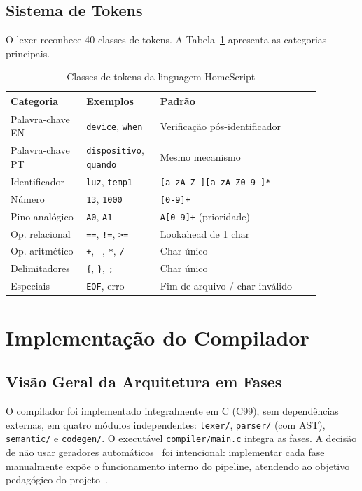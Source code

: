 \documentclass[conference]{IEEEtran}
\begin{document}
\subsection{Sistema de Tokens}

O lexer reconhece 40 classes de tokens. A Tabela~\ref{tab:tokens} apresenta
as categorias principais.

\begin{table}[htbp]
\caption{Classes de tokens da linguagem HomeScript}
\label{tab:tokens}
\centering
\begin{tabular}{p{0.21\linewidth}p{0.20\linewidth}p{0.47\linewidth}}
\toprule
\textbf{Categoria} & \textbf{Exemplos} & \textbf{Padrão} \\
\midrule
Palavra-chave EN & \texttt{device}, \texttt{when} & Verificação pós-identificador \\
Palavra-chave PT & \texttt{dispositivo}, \texttt{quando} & Mesmo mecanismo \\
Identificador & \texttt{luz}, \texttt{temp1} & \texttt{[a-zA-Z\_][a-zA-Z0-9\_]*} \\
Número & \texttt{13}, \texttt{1000} & \texttt{[0-9]+} \\
Pino analógico & \texttt{A0}, \texttt{A1} & \texttt{A[0-9]+} (prioridade) \\
Op. relacional & \texttt{==}, \texttt{!=}, \texttt{>=} & Lookahead de 1 char \\
Op. aritmético & \texttt{+}, \texttt{-}, \texttt{*}, \texttt{/} & Char único \\
Delimitadores & \texttt{\{}, \texttt{\}}, \texttt{;} & Char único \\
Especiais & \texttt{EOF}, erro & Fim de arquivo / char inválido \\
\bottomrule
\end{tabular}
\end{table}

\section{Implementação do Compilador}
\label{sec:compilador}

\subsection{Visão Geral da Arquitetura em Fases}

O compilador foi implementado integralmente em C (C99), sem dependências
externas, em quatro módulos independentes: \texttt{lexer/},
\texttt{parser/} (com AST), \texttt{semantic/} e \texttt{codegen/}.
O executável \texttt{compiler/main.c} integra as fases. A decisão de não
usar geradores automáticos~\cite{parr2013} foi intencional: implementar
cada fase manualmente expõe o funcionamento interno do pipeline, atendendo
ao objetivo pedagógico do projeto~\cite{aho2006,cooper2011}.
\end{document}
